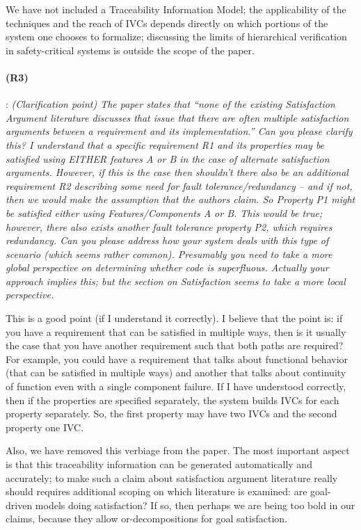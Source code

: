 \documentclass{article}
\begin{document}
We have not included a Traceability Information Model; the applicability of the techniques and the reach of IVCs depends directly on which portions of the system one chooses to formalize; discussing the limits of hierarchical verification in safety-critical systems is outside the scope of the paper.

\paragraph{(R3)}:
\textit{(Clarification point) The paper states that ``none of the existing Satisfaction Argument literature discusses that issue that there are often multiple satisfaction arguments between a requirement and its implementation.'' Can you please clarify this? I understand that a specific requirement R1 and its properties may be satisfied using EITHER features A or B in the case of alternate satisfaction arguments. However, if this is the case then shouldn't there also be an additional requirement R2 describing some need for fault tolerance/redundancy -- and if not, then we would make the assumption that the authors claim. So Property P1 might be satisfied either using Features/Components A or B. This would be true; however, there also exists another fault tolerance property P2, which requires redundancy. Can you please address how your system deals with this type of scenario (which seems rather common). Presumably you need to take a more global perspective on determining whether code is superfluous. Actually your approach implies this; but the section on Satisfaction seems to take a more local perspective.}
\vspace{0.05in}

This is a good point (if I understand it correctly).  I believe that the point is: if you have a requirement that can be satisfied in multiple ways, then is it usually the case that you have another requirement such that both paths are required?  For example, you could have a requirement that talks about functional behavior (that can be satisfied in multiple ways) and another that talks about continuity of function even with a single component failure.  If I have understood correctly, then if the properties are specified separately, the system builds IVCs for each property separately.  So, the first property may have two IVCs and the second property one IVC.

Also, we have removed this verbiage from the paper.  The most important aspect is that this traceability information can be generated automatically and accurately; to make such a claim about satisfaction argument literature really should requires additional scoping on which literature is examined: are goal-driven models doing satisfaction?  If so, then perhaps we are being too bold in our claims, because they allow or-decompositions for goal satisfaction.
\end{document}
